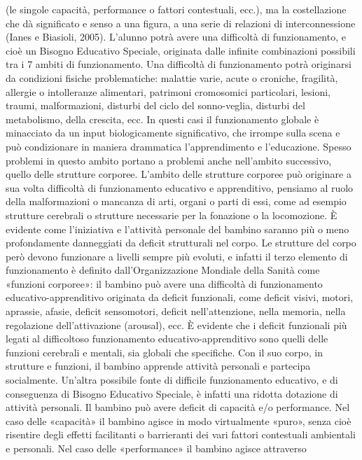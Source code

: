 (le singole capacità, performance o fattori contestuali, ecc.), ma la costellazione che dà significato e
senso a una figura, a una serie di relazioni di interconnessione (Ianes e Biasioli, 2005).
L'alunno potrà avere una difficoltà di funzionamento, e cioè un Bisogno Educativo Speciale,
originata dalle infinite combinazioni possibili tra i 7 ambiti di funzionamento.
Una difficoltà di funzionamento potrà originarsi da condizioni fisiche problematiche: malattie
varie, acute o croniche, fragilità, allergie o intolleranze alimentari, patrimoni cromosomici
particolari, lesioni, traumi, malformazioni, disturbi del ciclo del sonno-veglia, disturbi del
metabolismo, della crescita, ecc. In questi casi il funzionamento globale è minacciato da un input
biologicamente significativo, che irrompe sulla scena e può condizionare in maniera drammatica
l’apprendimento e l’educazione. Spesso problemi in questo ambito portano a problemi anche
nell’ambito successivo, quello delle strutture corporee.
L’ambito delle strutture corporee può originare a sua volta difficoltà di funzionamento
educativo e apprenditivo, pensiamo al ruolo della malformazioni o mancanza di arti, organi o parti
di essi, come ad esempio strutture cerebrali o strutture necessarie per la fonazione o la
locomozione. È evidente come l’iniziativa e l’attività personale del bambino saranno più o meno
profondamente danneggiati da deficit strutturali nel corpo. Le strutture del corpo però devono
funzionare a livelli sempre più evoluti, e infatti il terzo elemento di funzionamento è definito
dall’Organizzazione Mondiale della Sanità come «funzioni corporee»: il bambino può avere una
difficoltà di funzionamento educativo-apprenditivo originata da deficit funzionali, come deficit
visivi, motori, aprassie, afasie, deficit sensomotori, deficit nell’attenzione, nella memoria, nella
regolazione dell’attivazione (arousal), ecc. È evidente che i deficit funzionali più legati al difficoltoso
funzionamento educativo-apprenditivo sono quelli delle funzioni cerebrali e mentali, sia globali
che specifiche.
Con il suo corpo, in strutture e funzioni, il bambino apprende attività personali e partecipa
socialmente. Un’altra possibile fonte di difficile funzionamento educativo, e di conseguenza di
Bisogno Educativo Speciale, è infatti una ridotta dotazione di attività personali. Il bambino può
avere deficit di capacità e/o performance. Nel caso delle «capacità» il bambino agisce in modo
virtualmente «puro», senza cioè risentire degli effetti facilitanti o barrieranti dei vari fattori
contestuali ambientali e personali. Nel caso delle «performance» il bambino agisce attraverso

